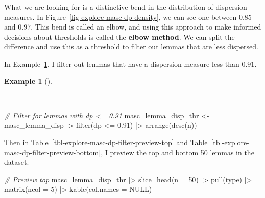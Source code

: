 \documentclass[
  letterpaper,
  krantz1]{latex/krantz-mod}
\newenvironment{Shaded}{\begin{snugshade}}{\end{snugshade}}
\newcommand{\AttributeTok}[1]{\textcolor[rgb]{0.00,0.00,0.00}{#1}}
\newcommand{\CommentTok}[1]{\textcolor[rgb]{0.00,0.00,0.00}{\textit{#1}}}
\newcommand{\ConstantTok}[1]{\textcolor[rgb]{0.00,0.00,0.00}{#1}}
\newcommand{\DecValTok}[1]{\textcolor[rgb]{0.00,0.00,0.00}{#1}}
\newcommand{\FloatTok}[1]{\textcolor[rgb]{0.00,0.00,0.00}{#1}}
\newcommand{\FunctionTok}[1]{\textcolor[rgb]{0.00,0.00,0.00}{#1}}
\newcommand{\NormalTok}[1]{\textcolor[rgb]{0.00,0.00,0.00}{#1}}
\newcommand{\OtherTok}[1]{\textcolor[rgb]{0.00,0.00,0.00}{#1}}
\newcommand{\SpecialCharTok}[1]{\textcolor[rgb]{0.00,0.00,0.00}{#1}}
\theoremstyle{definition}
\newtheorem{example}{Example}[chapter]
\theoremstyle{definition}
\theoremstyle{remark}
\begin{document}
What we are looking for is a distinctive bend in the distribution of
dispersion measures. In Figure~\ref{fig-explore-masc-dp-density}, we can
see one between \(0.85\) and \(0.97\). This bend is called an elbow, and
using this approach to make informed decisions about thresholds is
called the \textbf{elbow method}. We can split the difference and use
this as a threshold to filter out lemmas that are less dispersed.

In Example~\ref{exm-explore-masc-dp-filter}, I filter out lemmas that
have a dispersion measure less than \(0.91\).

\begin{example}[]\protect\hypertarget{exm-explore-masc-dp-filter}{}\label{exm-explore-masc-dp-filter}

~

\begin{Shaded}
\begin{Highlighting}[numbers=left,,]
\CommentTok{\# Filter for lemmas with dp \textless{}= 0.91}
\NormalTok{masc\_lemma\_disp\_thr }\OtherTok{\textless{}{-}}
\NormalTok{  masc\_lemma\_disp }\SpecialCharTok{|\textgreater{}}
  \FunctionTok{filter}\NormalTok{(dp }\SpecialCharTok{\textless{}=} \FloatTok{0.91}\NormalTok{) }\SpecialCharTok{|\textgreater{}}
  \FunctionTok{arrange}\NormalTok{(}\FunctionTok{desc}\NormalTok{(n))}
\end{Highlighting}
\end{Shaded}

\end{example}

Then in Table~\ref{tbl-explore-masc-dp-filter-preview-top} and
Table~\ref{tbl-explore-masc-dp-filter-preview-bottom}, I preview the top
and bottom 50 lemmas in the dataset.

\begin{Shaded}
\begin{Highlighting}[numbers=left,,]
\CommentTok{\# Preview top}
\NormalTok{masc\_lemma\_disp\_thr }\SpecialCharTok{|\textgreater{}}
  \FunctionTok{slice\_head}\NormalTok{(}\AttributeTok{n =} \DecValTok{50}\NormalTok{) }\SpecialCharTok{|\textgreater{}}
  \FunctionTok{pull}\NormalTok{(type) }\SpecialCharTok{|\textgreater{}}
  \FunctionTok{matrix}\NormalTok{(}\AttributeTok{ncol =} \DecValTok{5}\NormalTok{) }\SpecialCharTok{|\textgreater{}}
  \FunctionTok{kable}\NormalTok{(}\AttributeTok{col.names =} \ConstantTok{NULL}\NormalTok{)}
\end{Highlighting}
\end{Shaded}
\end{document}
